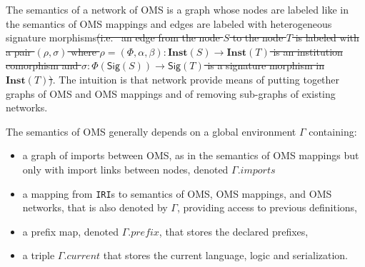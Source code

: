 \documentclass[10pt,fleqn,final]{scrreprt}
\newcommand*{\syntax}[1]{\texttt{#1}}
\newcommand{\Sig}{\mathsf{Sig}}
\newcommand{\Inst}{\ensuremath{\mathbf{Inst}}}
\newcommand{\prefix}{\mathit{prefix}}
\newcommand{\current}{\mathit{current}}
\providecommand{\DIFdel}[1]{{\protect\color{red}\sout{#1}}}                      %
\providecommand{\DIFdelbegin}{} %
\providecommand{\DIFdelend}{} %
\begin{document}
The semantics of a network of OMS is a graph
whose nodes are labeled like in the semantics of OMS mappings and 
edges are labeled with heterogeneous signature morphisms\DIFdelbegin \DIFdel{(i.e.~ 
an edge from the node $S$ to the node $T$ is labeled with a pair 
$(\rho, \sigma)$ where $\rho=(\Phi,\alpha,\beta):\Inst(S)\to\Inst(T)$ is an institution comorphism and
$\sigma:\Phi(\Sig(S))\to\Sig(T)$ is a signature morphism in $\Inst(T)$)}\DIFdelend . 
The intuition is that
network provide means of putting together graphs of OMS and OMS mappings
and of removing sub-graphs of existing networks. 

The semantics of OMS generally depends on a global environment
$\Gamma$ containing:
 \begin{itemize}
    \item a graph of imports between OMS, as in the semantics of OMS mappings but
          only with import links between nodes, denoted $\Gamma.imports$
    \item a mapping from \syntax{IRI}s to semantics of OMS, OMS mappings, and OMS networks, that 
               is also denoted by $\Gamma$, providing access to previous definitions,
    \item a prefix map, denoted $\Gamma.\prefix$, that stores the declared prefixes,
    \item a triple $\Gamma.\current$ that stores the current language, logic and serialization. 
 \end{itemize}
\end{document}
